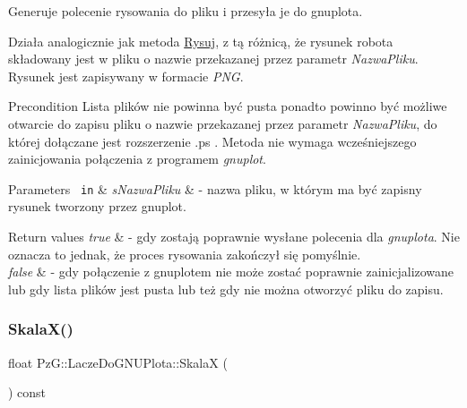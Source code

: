 Generuje polecenie rysowania do pliku i przesyła je do gnuplota. 

Działa analogicznie jak metoda \mbox{\hyperlink{class_pz_g_1_1_lacze_do_g_n_u_plota_a065f5b8402737cc62b0ad4f66d028335}{Rysuj}}, z tą różnicą, że rysunek robota składowany jest w pliku o nazwie przekazanej przez parametr {\itshape Nazwa\+Pliku}. Rysunek jest zapisywany w formacie {\itshape P\+NG}.

\begin{DoxyPrecond}{Precondition}
Lista plików nie powinna być pusta ponadto powinno być możliwe otwarcie do zapisu pliku o nazwie przekazanej przez parametr {\itshape Nazwa\+Pliku}, do której dołączane jest rozszerzenie .ps . Metoda nie wymaga wcześniejszego zainicjowania połączenia z programem {\itshape gnuplot}.
\end{DoxyPrecond}

\begin{DoxyParams}[1]{Parameters}
\mbox{\texttt{ in}}  & {\em s\+Nazwa\+Pliku} & -\/ nazwa pliku, w którym ma być zapisny rysunek tworzony przez gnuplot.\\
\hline
\end{DoxyParams}

\begin{DoxyRetVals}{Return values}
{\em true} & -\/ gdy zostają poprawnie wysłane polecenia dla {\itshape gnuplota}. Nie oznacza to jednak, że proces rysowania zakończył się pomyślnie. \\
\hline
{\em false} & -\/ gdy połączenie z gnuplotem nie może zostać poprawnie zainicjalizowane lub gdy lista plików jest pusta lub też gdy nie można otworzyć pliku do zapisu. \\
\hline
\end{DoxyRetVals}
\mbox{\label{class_pz_g_1_1_lacze_do_g_n_u_plota_a4b1eb252fd785a5aeff938e7b2dce2b1}} 
\subsubsection{\texorpdfstring{SkalaX()}{SkalaX()}}
{\footnotesize\ttfamily float Pz\+G\+::\+Lacze\+Do\+G\+N\+U\+Plota\+::\+SkalaX (\begin{DoxyParamCaption}{ }\end{DoxyParamCaption}) const\hspace{0.3cm}{\ttfamily [inline]}}



